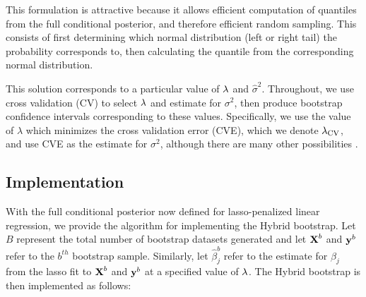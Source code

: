 This formulation is attractive because it allows efficient computation of quantiles from the full conditional posterior, and therefore efficient random sampling. This consists of first determining which normal distribution (left or right tail) the probability corresponds to, then calculating the quantile from the corresponding normal distribution.

This solution corresponds to a particular value of $\lambda$ and $\hat{\sigma}^2$. Throughout, we use cross validation (CV) to select $\lambda$ and estimate for $\sigma^2$, then produce bootstrap confidence intervals corresponding to these values. Specifically, we use the value of $\lambda$ which minimizes the cross validation error (CVE), which we denote $\lambda_{\textrm{CV}}$, and use CVE as the estimate for $\sigma^2$, although there are many other possibilities \citep{Reid2016}.


\subsection{Implementation}
\label{Sec:implementation}

With the full conditional posterior now defined for lasso-penalized linear regression, we provide the algorithm for implementing the Hybrid bootstrap. Let $B$ represent the total number of bootstrap datasets generated and let $\boldsymbol{\mathbf{X}}^b$ and $\boldsymbol{\mathbf{y}}^{b}$ refer to the $b^{th}$ bootstrap sample. Similarly, let $\hat{\beta}^b_j$ refer to the estimate for $\beta_j$ from the lasso fit to $\boldsymbol{\mathbf{X}}^b$ and $\boldsymbol{\mathbf{y}}^b$ at a specified value of $\lambda$. The Hybrid bootstrap is then implemented as follows:


